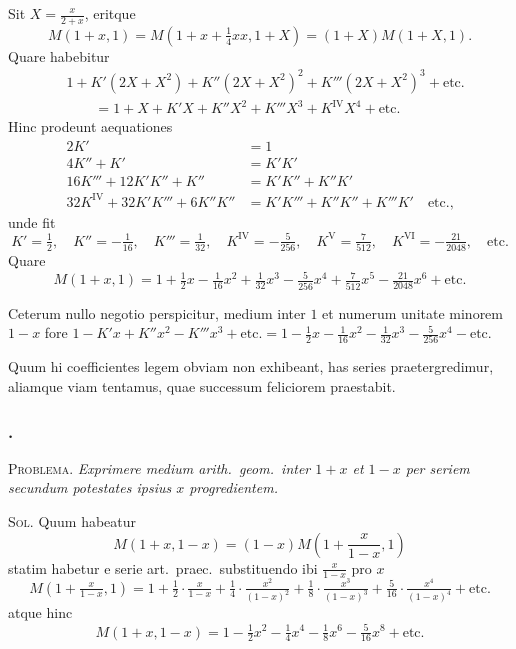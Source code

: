\documentclass[12pt,a4paper]{article}
\begin{document}
Sit $X = \frac{x}{2+x}$, eritque
\[
M(1+x,1) = M\left(1+x+\tfrac{1}{4}xx, 1+X\right) = (1+X)M(1+X,1).
\]
Quare habebitur
\[
\begin{aligned}
&1 + K'(2X+X^2) + K''(2X+X^2)^2 + K'''(2X+X^2)^3 + \text{etc.} \\
&\qquad = 1 + X + K'X + K''X^2 + K'''X^3 + K^{\mathrm{IV}}X^4 + \text{etc.}
\end{aligned}
\]
Hinc prodeunt aequationes
\[
\begin{aligned}
2K' &= 1 \\
4K'' + K' &= K'K' \\
16K''' + 12K'K'' + K'' &= K'K'' + K''K' \\
32K^{\mathrm{IV}} + 32K'K''' + 6K''K'' &= K'K''' + K''K'' + K'''K' \quad\text{etc.,}
\end{aligned}
\]
unde fit
\[
K' = \tfrac{1}{2}, \quad K'' = -\tfrac{1}{16}, \quad K''' = \tfrac{1}{32}, \quad K^{\mathrm{IV}} = -\tfrac{5}{256}, \quad K^{\mathrm{V}} = \tfrac{7}{512}, \quad K^{\mathrm{VI}} = -\tfrac{21}{2048}, \quad\text{etc.}
\]
Quare
\[
M(1+x,1) = 1 + \tfrac{1}{2}x - \tfrac{1}{16}x^2 + \tfrac{1}{32}x^3 - \tfrac{5}{256}x^4 + \tfrac{7}{512}x^5 - \tfrac{21}{2048}x^6 + \text{etc.}
\]

Ceterum nullo negotio perspicitur, medium inter $1$ et numerum unitate minorem $1-x$ fore $1 - K'x + K''x^2 - K'''x^3 + \text{etc.} = 1 - \frac{1}{2}x - \frac{1}{16}x^2 - \frac{1}{32}x^3 - \frac{5}{256}x^4 - \text{etc.}$

Quum hi coefficientes legem obviam non exhibeant, has series praetergredimur, aliamque viam tentamus, quae successum feliciorem praestabit.

\subsubsection*{.}

\textsc{Problema.} \textit{Exprimere medium arith.\ geom.\ inter $1+x$ et $1-x$ per seriem secundum potestates ipsius $x$ progredientem.}

\textsc{Sol.} Quum habeatur
\[
M(1+x, 1-x) = (1-x)M\left(1+\frac{x}{1-x}, 1\right)
\]
statim habetur e serie art.\ praec.\ substituendo ibi $\frac{x}{1-x}$ pro $x$
\[
M(1+\tfrac{x}{1-x}, 1) = 1 + \tfrac{1}{2}\cdot\tfrac{x}{1-x} + \tfrac{1}{4}\cdot\tfrac{x^2}{(1-x)^2} + \tfrac{1}{8}\cdot\tfrac{x^3}{(1-x)^3} + \tfrac{5}{16}\cdot\tfrac{x^4}{(1-x)^4} + \text{etc.}
\]
atque hinc
\[
M(1+x, 1-x) = 1 - \tfrac{1}{2}x^2 - \tfrac{1}{4}x^4 - \tfrac{1}{8}x^6 - \tfrac{5}{16}x^8 + \text{etc.}
\]
\end{document}
